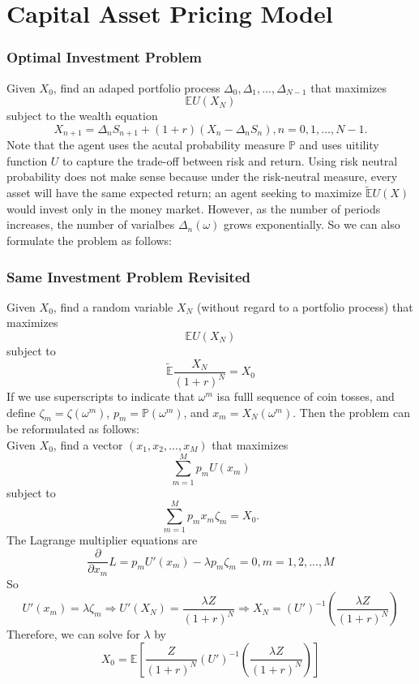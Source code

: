 \documentclass[a4paper]{article}
\theoremstyle{definition}
\begin{document}
\section{Capital Asset Pricing Model}
\subsubsection*{Optimal Investment Problem}
Given $X_0$, find an adaped portfolio process $\Delta_0, \Delta_1,...,\Delta_{N-1}$ that maximizes
$$\mathbb{E}U(X_N)$$ subject to the wealth equation
$$X_{n+1} = \Delta_nS_{n+1}+(1+r)(X_n-\Delta_nS_n), n=0,1,...,N-1.$$
Note that the agent uses the acutal probability measure $\mathbb{P}$ and uses uitility function $U$ to capture the trade-off between risk and return. Using risk neutral probability does not make sense because under the risk-neutral measure, every asset will have the same expected return; an agent seeking to maximize $\tilde{\mathbb{E}}U(X)$ would invest only in the money market. 
However, as the number of periods increases, the number of varialbes $\Delta_n(\omega)$ grows exponentially. So we can also formulate the problem as follows:
\subsubsection*{Same Investment Problem Revisited}
Given $X_0$, find a random variable $X_N$ (without regard to a portfolio process) that maximizes
$$\mathbb{E}U(X_N)$$
subject to $$\tilde{\mathbb{E}}\frac{X_N}{(1+r)^N}=X_0$$
If we use superscripts to indicate that $\omega^m$ isa fulll sequence of coin tosses, and define $\zeta_m = \zeta(\omega^m)$, $p_m = \mathbb{P}(\omega^m)$, and $x_m = X_N(\omega^m)$. Then the problem can be reformulated as follows:\\
Given $X_0$, find a vector $(x_1,x_2,...,x_M)$ that maximizes 
$$\sum_{m=1}^Mp_m U(x_m)$$
subject to $$\sum_{m=1}^Mp_mx_m\zeta_m = X_0.$$
The Lagrange multiplier equations are 
$$\frac{\partial}{\partial x_m}L  = p_mU'(x_m) - \lambda p_m\zeta_m = 0, m=1,2,...,M$$
So$$ U'(x_m) = \lambda \zeta_m \Longrightarrow U'(X_N) = \frac{\lambda Z}{(1+r)^N}\Longrightarrow X_N = (U')^{-1}\left(\frac{\lambda Z}{(1+r)^N}\right)$$
Therefore, we can solve for $\lambda$ by 
$$X_0 = \mathbb{E}\left[\frac{Z}{(1+r)^N}(U')^{-1}\left(\frac{\lambda Z}{(1+r)^N}\right)\right]$$
\end{document}
